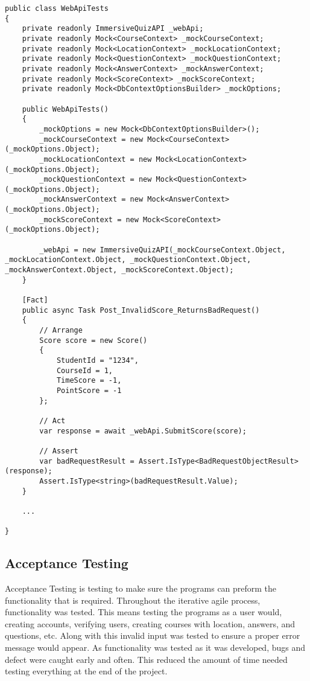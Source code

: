 \begin{lstlisting}[caption=Example Unit Test,label=lst:UnitTest]
public class WebApiTests
{
	private readonly ImmersiveQuizAPI _webApi;
	private readonly Mock<CourseContext> _mockCourseContext;
	private readonly Mock<LocationContext> _mockLocationContext;
	private readonly Mock<QuestionContext> _mockQuestionContext;
	private readonly Mock<AnswerContext> _mockAnswerContext;
	private readonly Mock<ScoreContext> _mockScoreContext;
	private readonly Mock<DbContextOptionsBuilder> _mockOptions;
	
	public WebApiTests()
	{
		_mockOptions = new Mock<DbContextOptionsBuilder>();
		_mockCourseContext = new Mock<CourseContext>(_mockOptions.Object);
		_mockLocationContext = new Mock<LocationContext>(_mockOptions.Object);
		_mockQuestionContext = new Mock<QuestionContext>(_mockOptions.Object);
		_mockAnswerContext = new Mock<AnswerContext>(_mockOptions.Object);
		_mockScoreContext = new Mock<ScoreContext>(_mockOptions.Object);
		
		_webApi = new ImmersiveQuizAPI(_mockCourseContext.Object, _mockLocationContext.Object, _mockQuestionContext.Object, _mockAnswerContext.Object, _mockScoreContext.Object);
	}
	
	[Fact]
	public async Task Post_InvalidScore_ReturnsBadRequest()
	{
		// Arrange
		Score score = new Score()
		{
			StudentId = "1234",
			CourseId = 1,
			TimeScore = -1,
			PointScore = -1
		};
		
		// Act
		var response = await _webApi.SubmitScore(score);
		
		// Assert
		var badRequestResult = Assert.IsType<BadRequestObjectResult>(response);
		Assert.IsType<string>(badRequestResult.Value);
	} 
	
	...
	
}
\end{lstlisting}

\subsection{Acceptance Testing}
Acceptance Testing is testing to make sure the programs can preform the functionality that is required. Throughout the iterative agile process, functionality was tested. This means testing the programs as a user would, creating accounts, verifying users, creating courses with location, answers, and questions, etc. Along with this invalid input was tested to ensure a proper error message would appear. As functionality was tested as it was developed, bugs and defect were caught early and often. This reduced the amount of time needed testing everything at the end of the project.

